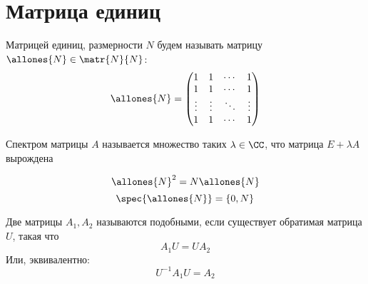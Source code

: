 \section{Матрица единиц}

Матрицей единиц, размерности \( N \) будем называть матрицу
\( \allones{N} \in \matr{N}{N} \):
\[
    \allones{N} =
    \begin{pmatrix}
    1 & 1  & \cdots & 1 \\
    1 & 1  & \cdots & 1 \\
    \vdots & \vdots & \ddots & \vdots \\
    1 & 1  & \cdots & 1
    \end{pmatrix}
\]

Спектром матрицы \( A \) называется множество таких \( \lambda\in\CC \),
что матрица \( E + \lambda A \) вырождена

\begin{propose}
\[
    \allones{N}^2 = N \allones{N}
    \]
\[
    \spec{\allones{N}} = \left\{ 0, N \right\}
    \]
\end{propose}

\begin{dfn}
    Две матрицы \( A_1, A_2 \)
    называются подобными, если существует обратимая матрица \( U \),
    такая что
    \[
        A_1 U = U A_2
        \]
    Или, эквивалентно:
    \[
        U^{-1} A_1 U = A_2
        \]
\end{dfn}


